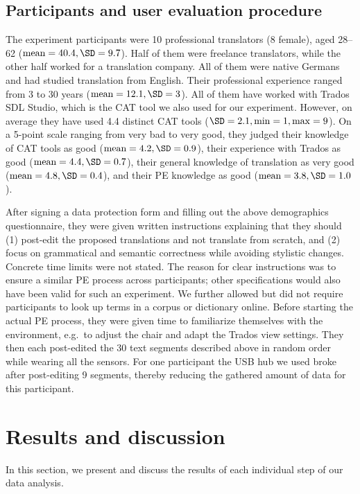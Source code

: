 \documentclass[output=paper]{langsci/langscibook}
\begin{document}
\subsection{Participants and user evaluation procedure}
The experiment participants were 10 professional translators (8 female), aged 28--62 ($\text{mean}=40.4, \SD=9.7$). Half of them were freelance translators, while the other half worked for a translation company. All of them were native Germans and had studied translation from English. Their professional experience ranged from 3 to 30 years ($\text{mean}=12.1, \SD=3$). All of them have worked with Trados SDL Studio, which is the CAT tool we also used for our experiment. However, on average they have used 4.4 distinct CAT tools ($\SD=2.1, \min=1, \max=9$). On a 5-point scale ranging from very bad to very good, they judged their knowledge of CAT tools as good ($\text{mean}=4.2, \SD=0.9$), their experience with Trados as good ($\text{mean}=4.4, \SD=0.7$), their general knowledge of translation as very good ($\text{mean}=4.8, \SD=0.4$), and their PE knowledge as good ($\text{mean}=3.8, \SD=1.0$).

After signing a data protection form and filling out the above demographics questionnaire, they were given written instructions explaining that they should (1) post-edit the proposed translations and not translate from scratch, and (2) focus on grammatical and semantic correctness while avoiding stylistic changes. Concrete time limits were not stated. The reason for clear instructions was to ensure a similar PE process across participants; other specifications would also have been valid for such an experiment.
We further allowed but did not require participants to look up terms in a corpus or dictionary online. Before starting the actual PE process, they were given time to familiarize themselves with the environment, e.g.\ to adjust the chair and adapt the Trados view settings.
They then each post-edited the 30 text segments described above in random order while wearing all the sensors.
For one participant the USB hub we used broke after post-editing 9 segments, thereby reducing the gathered amount of data for this participant.

\section{Results and discussion}\largerpage
In this section, we present and discuss the results of each individual step of our data analysis.
\end{document}

